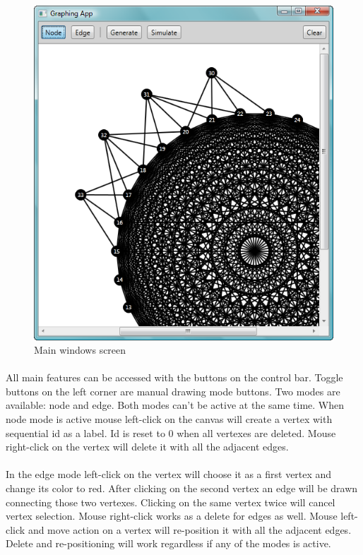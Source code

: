 \documentclass[a4paper,TexShade]{class}
\begin{document}
\bigskip
\begin{figure}[h]
\centering
\caption{Main windows screen} \label{fig:main1}
\includegraphics[width=0.8\linewidth ,natwidth=531,natheight=593]{images/main.png}
\end{figure}

\paragraph{} All main features can be accessed with the buttons on the control bar. Toggle buttons on the left corner are manual drawing mode buttons. Two modes are available: node and edge. Both modes can't be active at the same time. When node mode is active mouse left-click on the canvas will create a vertex with sequential id as a label. Id is reset to 0 when all vertexes are deleted. Mouse right-click on the vertex will delete it with all the adjacent edges.

\paragraph{} In the edge mode left-click on the vertex will choose it as a first vertex and change its color to red. After clicking on the second vertex an edge will be drawn connecting those two vertexes. Clicking on the same vertex twice will cancel vertex selection. Mouse right-click works as a delete for edges as well. Mouse left-click and move action on a vertex will re-position it with all the adjacent edges. Delete and re-positioning will work regardless if any of the modes is active.
\end{document}
